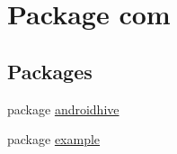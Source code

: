 \hypertarget{namespacecom}{\section{Package com}
\label{namespacecom}
}
\subsection*{Packages}
\begin{DoxyCompactItemize}
\item 
package \hyperlink{namespacecom_1_1androidhive}{androidhive}
\item 
package \hyperlink{namespacecom_1_1example}{example}
\end{DoxyCompactItemize}

